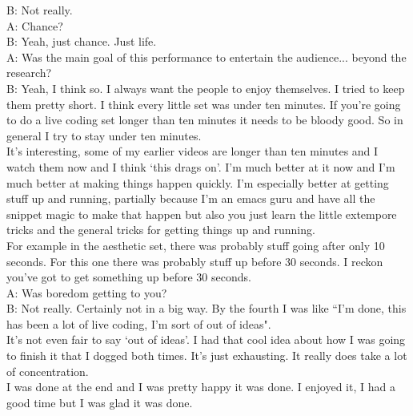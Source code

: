 \documentclass[12pt]{article}
\begin{document}
B: Not really.\\

A: Chance?\\

B: Yeah, just chance. Just life.\\

A: Was the main goal of this performance to entertain the audience... beyond the research?\\

B: Yeah, I think so. I always want the people to enjoy themselves. I tried to keep them pretty short. I think every little set was under ten minutes. If you're going to do a live coding set longer than ten minutes it needs to be bloody good. So in general I try to stay under ten minutes.\\

It's interesting, some of my earlier videos are longer than ten minutes and I watch them now and I think `this drags on'. I'm much better at it now and I'm much better at making things happen quickly. I'm especially better at getting stuff up and running, partially because I'm an emacs guru and have all the snippet magic to make that happen but also you just learn the little extempore tricks and the general tricks for getting things up and running.\\

For example in the aesthetic set, there was probably stuff going after only 10 seconds. For this one there was probably stuff up before 30 seconds. I reckon you've got to get something up before 30 seconds.\\

A: Was boredom getting to you?\\

B: Not really. Certainly not in a big way. By the fourth I was like ``I'm done, this has been a lot of live coding, I'm sort of out of ideas".\\

It's not even fair to say `out of ideas'. I had that cool idea about how I was going to finish it that I dogged both times. It's just exhausting. It really does take a lot of concentration.\\

I was done at the end and I was pretty happy it was done. I enjoyed it, I had a good time but I was glad it was done.\\
\end{document}
